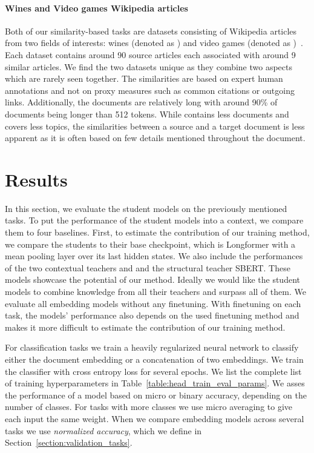 \paragraph{Wines and Video games Wikipedia articles} Both of our
similarity-based tasks are datasets consisting of Wikipedia articles from two
fields of interests: wines (denoted as ) and video games (denoted
as )~\citep{ginzburg2021self}. Each dataset contains around 90
source articles each associated with around 9 similar articles. We find the two
datasets unique as they combine two aspects which are rarely seen together. The
similarities are based on expert human annotations and not on proxy measures
such as common citations or outgoing links. Additionally, the documents are
relatively long with around 90\% of documents being longer than 512 tokens.
While  contains less documents and covers less topics, the
similarities between a source and a target document is less apparent as it is
often based on few details mentioned throughout the document.

\section{Results}\label{section:eval_results}

In this section, we evaluate the student models on the previously mentioned
tasks. To put the performance of the student models into a context, we compare
them to four baselines. First, to estimate the contribution of our training
method, we compare the students to their base checkpoint, which is Longformer
with a mean pooling layer over its last hidden states. We also include the
performances of the two contextual teachers  and  and the
structural teacher SBERT. These models showcase the potential of our method.
Ideally we would like the student models to combine knowledge from all their
teachers and surpass all of them. We evaluate all embedding models without any
finetuning. With finetuning on each task, the models' performance also depends
on the used finetuning method and makes it more difficult to estimate the
contribution of our training method.

For classification tasks we train a heavily regularized neural network to
classify either the document embedding or a concatenation of two embeddings. We
train the classifier with cross entropy loss for several epochs. We list the
complete list of training hyperparameters in
Table~\ref{table:head_train_eval_params}. We asses the performance of a model
based on micro or binary accuracy, depending on the number of classes. For
tasks with more classes we use micro averaging to give each input the same
weight. When we compare embedding models across several tasks we use
\emph{normalized accuracy}, which we define in
Section~\ref{section:validation_tasks}.

